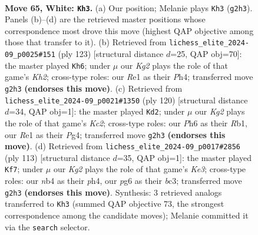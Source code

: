 \documentclass[11pt]{article}
\begin{document}
\clearpage

\begin{figure}[p]\centering
\begin{subfigure}{0.46\textwidth}\centering
\resizebox{\linewidth}{!}{%
\newchessgame
\chessboard[
  setfen={3R4/1p5p/1k4pP/p4p2/1n3P2/8/1r4K1/4R3 w - - 17 65},
  showmover=false,
  pgfstyle=straightmove, color=movearrow, markmove={g2-h3}
]}
\caption{}
\end{subfigure}\hfill
\begin{subfigure}{0.46\textwidth}\centering
\resizebox{\linewidth}{!}{%
\newchessgame
\chessboard[
  setfen={8/2R4k/5K2/4pP2/3pP2p/3P4/2P5/6r1 b - - 8 62},
  showmover=false,
  pgfstyle=straightmove, color=movearrow, markmove={h7-h6}
]}
\caption{}
\end{subfigure}
\\[4pt]
\begin{subfigure}{0.46\textwidth}\centering
\resizebox{\linewidth}{!}{%
\newchessgame
\chessboard[
  setfen={8/b5kp/6p1/4n3/6PP/4r3/2K2p2/1R6 w - - 0 61},
  showmover=false,
  pgfstyle=straightmove, color=movearrow, markmove={c2-d2}
]}
\caption{}
\end{subfigure}\hfill
\begin{subfigure}{0.46\textwidth}\centering
\resizebox{\linewidth}{!}{%
\newchessgame
\chessboard[
  setfen={8/8/4k1p1/1p4K1/7P/P1B2P1P/1P6/3r4 b - - 19 57},
  showmover=false,
  pgfstyle=straightmove, color=movearrow, markmove={e6-f7}
]}
\caption{}
\end{subfigure}
\caption{\textbf{Move 65, White: \texttt{Kh3}.} (a) Our position; Melanie plays \texttt{Kh3} (\texttt{g2h3}). Panels (b)--(d) are the retrieved master positions whose correspondence most drove this move (highest QAP objective among those that transfer to it). (b) Retrieved from \texttt{lichess\_elite\_2024-09\_p0025\#151} (ply 123) [structural distance $d$=25, QAP obj=70]: the master played \texttt{Kh6}; under $\mu$ our \emph{Kg2} plays the role of that game's \emph{Kh2}; cross-type roles: our \emph{R}e1 as their \emph{P}h4; transferred move \texttt{g2h3} \textbf{(endorses this move)}. (c) Retrieved from \texttt{lichess\_elite\_2024-09\_p0021\#1350} (ply 120) [structural distance $d$=34, QAP obj=1]: the master played \texttt{Kd2}; under $\mu$ our \emph{Kg2} plays the role of that game's \emph{Kc2}; cross-type roles: our \emph{P}h6 as their \emph{R}b1, our \emph{R}e1 as their \emph{P}g4; transferred move \texttt{g2h3} \textbf{(endorses this move)}. (d) Retrieved from \texttt{lichess\_elite\_2024-09\_p0017\#2856} (ply 113) [structural distance $d$=35, QAP obj=1]: the master played \texttt{Kf7}; under $\mu$ our \emph{Kg2} plays the role of that game's \emph{Ke3}; cross-type roles: our \emph{n}b4 as their \emph{p}h4, our \emph{p}g6 as their \emph{b}c3; transferred move \texttt{g2h3} \textbf{(endorses this move)}. Synthesis: 3 retrieved analogs transferred to \texttt{Kh3} (summed QAP objective 73, the strongest correspondence among the candidate moves); Melanie committed it via the \texttt{search} selector.}
\label{fig:thought-m128}
\end{figure}
\end{document}
